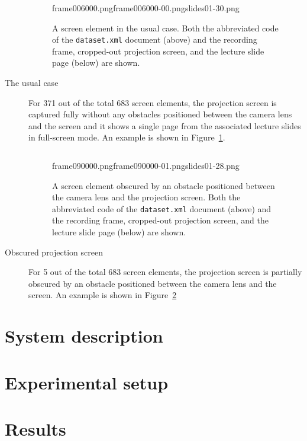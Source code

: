 \begin{description}
  \begin{figure}
    \inputminted{xml}{fig/examples/normal/example.xml}
      {frame006000.png}{frame006000-00.png}{slides01-30.png}
    \caption{A screen element in the usual case. Both the abbreviated code
      of the \texttt{dataset.xml} document (above) and the recording frame,
      cropped-out projection screen, and the lecture slide page (below) are
      shown.}
    \label{fig:example-normal}
  \end{figure}
  \item[The usual case] For 371 out of the total 683 screen elements, the
    projection screen is captured fully without any obstacles positioned
    between the camera lens and the screen and it shows a single page from the
    associated lecture slides in full-screen mode. An example is shown in
    Figure~\ref{fig:example-normal}.

  \begin{figure}
    {\renewcommand\fcolorbox[4][rgb]{#4\kern1pt}%
     \inputminted{xml}{fig/examples/obstacle/example.xml}}
      {frame090000.png}{frame090000-01.png}{slides01-28.png}
    \caption{A screen element obscured by an obstacle positioned between the
      camera lens and the projection screen. Both the abbreviated code of the
      \texttt{dataset.xml} document (above) and the recording frame,
      cropped-out projection screen, and the lecture slide page (below) are
      shown.}
    \label{fig:example-obstacle}
  \end{figure}
  \item[Obscured projection screen] For 5 out of the total 683 screen elements,
    the projection screen is partially obscured by an obstacle positioned
    between the camera lens and the screen. An example is shown in
    Figure~\ref{fig:example-obstacle}
\end{description}

\section{System description}
\section{Experimental setup}
\section{Results}
